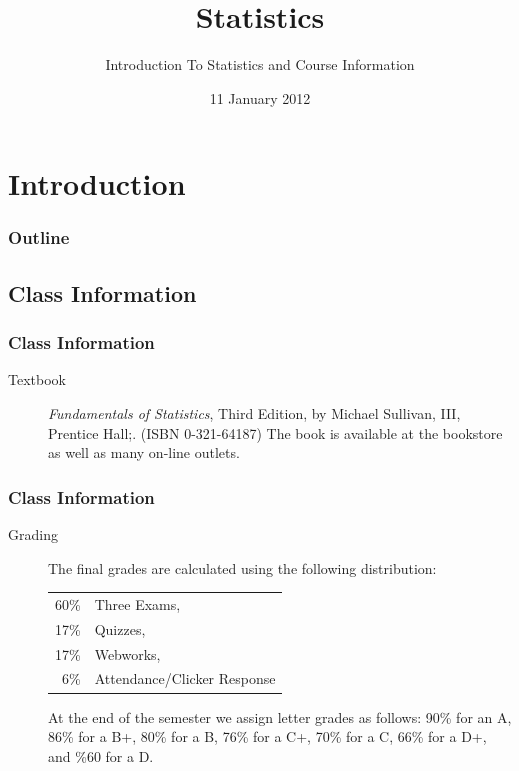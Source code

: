 
\section{Introduction}

\title{Statistics}
\subtitle{Introduction To Statistics and Course Information}

\date{11 January 2012}

\begin{frame}
  \titlepage
\end{frame}

\begin{frame}
  \frametitle{Outline}
  \tableofcontents[hideothersubsections,sectionstyle=show/hide]
\end{frame}


\subsection{Class Information}


\begin{frame}
  \frametitle{Class Information}

\begin{description}
\item[Textbook] {\em Fundamentals of Statistics}, Third Edition, by
  Michael Sullivan, III, Prentice Hall;. (ISBN 0-321-64187) The book
  is available at the bookstore as well as many on-line outlets.

\end{description}

\end{frame}


\begin{frame}
  \frametitle{Class Information}

\begin{description}
\item[Grading] %
  
  The final grades are calculated using the following distribution:
    \begin{tabular}[t]{rl}
      60\% & Three Exams, \\
      17\% & Quizzes, \\
      17\% & Webworks, \\
      6\%  & Attendance/Clicker Response \\
    \end{tabular}
  
    At the end of the semester we assign letter grades as follows:
    90\% for an A, 86\% for a B+, 80\% for a B, 76\% for a C+, 70\%
    for a C, 66\% for a D+, and \%60 for a D.
\end{description}

\end{frame}



